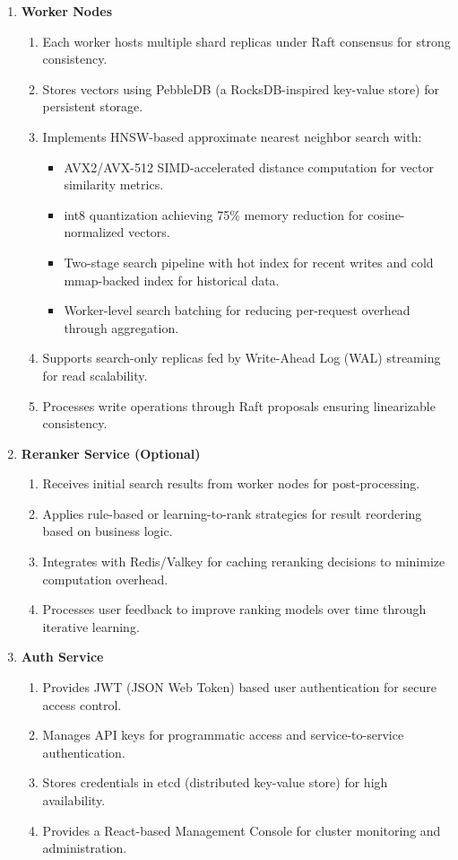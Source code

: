 \begin{enumerate}
    \item \textbf{Worker Nodes}
    \begin{enumerate}
        \item Each worker hosts multiple shard replicas under Raft consensus for strong consistency.
        \item Stores vectors using PebbleDB (a RocksDB-inspired key-value store) for persistent storage.
        \item Implements HNSW-based approximate nearest neighbor search with:
        \begin{itemize}
            \item AVX2/AVX-512 SIMD-accelerated distance computation for vector similarity metrics.
            \item int8 quantization achieving 75\% memory reduction for cosine-normalized vectors.
            \item Two-stage search pipeline with hot index for recent writes and cold mmap-backed index for historical data.
            \item Worker-level search batching for reducing per-request overhead through aggregation.
        \end{itemize}
        \item Supports search-only replicas fed by Write-Ahead Log (WAL) streaming for read scalability.
        \item Processes write operations through Raft proposals ensuring linearizable consistency.
    \end{enumerate}

    \item \textbf{Reranker Service (Optional)}
    \begin{enumerate}
        \item Receives initial search results from worker nodes for post-processing.
        \item Applies rule-based or learning-to-rank strategies for result reordering based on business logic.
        \item Integrates with Redis/Valkey for caching reranking decisions to minimize computation overhead.
        \item Processes user feedback to improve ranking models over time through iterative learning.
    \end{enumerate}

    \item \textbf{Auth Service}
    \begin{enumerate}
        \item Provides JWT (JSON Web Token) based user authentication for secure access control.
        \item Manages API keys for programmatic access and service-to-service authentication.
        \item Stores credentials in etcd (distributed key-value store) for high availability.
        \item Provides a React-based Management Console for cluster monitoring and administration.
    \end{enumerate}


\end{enumerate}
